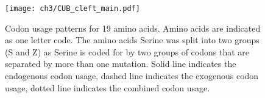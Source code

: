 \begin{figure}[H]
     \centering
	\texttt{[image: ch3/CUB\_cleft\_main.pdf]}
	\caption{Codon usage patterns for 19 amino acids. Amino acids are indicated as one letter code. 
	The amino acids Serine was split into two groups (S and Z) as Serine is coded for by two groups of codons that are separated by more than one mutation.
	Solid line indicates the endogenous codon usage, dashed line indicates the exogenous codon usage, dotted line indicates the combined codon usage.}
	\label{fig:cub_all_sets}
\end{figure}
\doublespacing